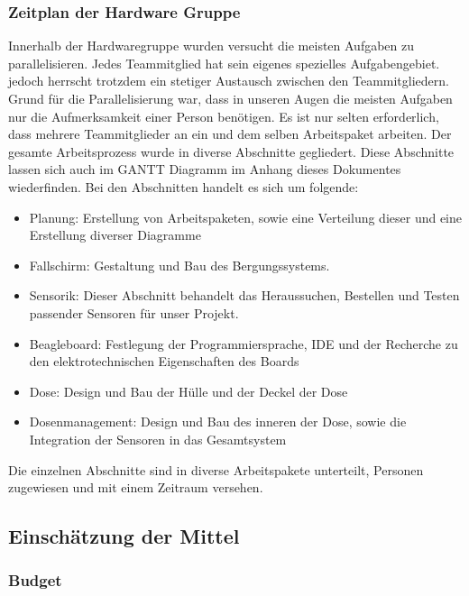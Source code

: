 \subsubsection{Zeitplan der Hardware Gruppe}
Innerhalb der Hardwaregruppe wurden versucht die meisten Aufgaben zu parallelisieren. Jedes Teammitglied hat sein eigenes spezielles Aufgabengebiet. jedoch herrscht trotzdem ein stetiger Austausch zwischen den Teammitgliedern. Grund für die Parallelisierung war, dass in unseren Augen die meisten Aufgaben  nur die Aufmerksamkeit einer Person benötigen. Es ist nur selten erforderlich, dass mehrere Teammitglieder an ein und dem selben Arbeitspaket arbeiten. Der gesamte Arbeitsprozess wurde in diverse Abschnitte gegliedert. Diese Abschnitte lassen sich auch im GANTT Diagramm im Anhang dieses Dokumentes wiederfinden. Bei den Abschnitten handelt es sich um folgende:
\begin{itemize}
\item Planung: Erstellung von Arbeitspaketen, sowie eine Verteilung dieser und eine Erstellung diverser Diagramme
\item Fallschirm: Gestaltung und Bau des Bergungssystems.
\item Sensorik: Dieser Abschnitt behandelt das Heraussuchen, Bestellen und Testen passender Sensoren für unser Projekt.
\item Beagleboard: Festlegung der Programmiersprache, IDE und der Recherche zu den elektrotechnischen Eigenschaften des Boards
\item Dose: Design und Bau der Hülle und der Deckel der Dose
\item Dosenmanagement: Design und Bau des inneren der Dose, sowie die Integration der Sensoren in das Gesamtsystem
\end{itemize}

Die einzelnen Abschnitte sind in diverse Arbeitspakete unterteilt, Personen zugewiesen und mit einem Zeitraum versehen.
\subsection{Einschätzung der Mittel}
\subsubsection{Budget}
\label{subsubsec:Budget}

